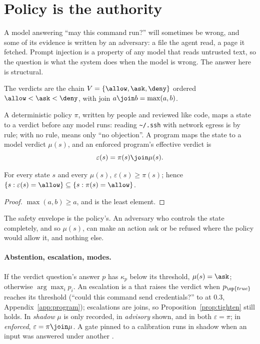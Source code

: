 \section{Policy is the authority}
\label{sec:authority}

A model answering ``may this command run?'' will sometimes be wrong, and some
of its evidence is written by an adversary: a file the agent read, a page it
fetched. Prompt injection is a property of any model that reads untrusted text,
so the question is what the system does when the model is wrong. The answer
here is structural.

\begin{definition}[Verdicts]
The verdicts are the chain $V = \{\allow, \ask, \deny\}$ ordered
$\allow < \ask < \deny$, with join $a \join b = \max(a, b)$.
\end{definition}

A deterministic policy $\pi$, written by people and reviewed like code, maps a
state to a verdict before any model runs: reading \texttt{\textasciitilde/.ssh}
with network egress is \deny{} by rule; with no rule, \allow{} means only ``no
objection''. A program maps the state to a model verdict $\mu(s)$, and an
enforced program's effective verdict is
\begin{equation}
  \varepsilon(s) = \pi(s) \join \mu(s).
  \label{eq:join}
\end{equation}

\begin{proposition}
\label{prop:tighten}
For every state $s$ and every $\mu(s)$, $\varepsilon(s) \ge \pi(s)$; hence
$\{s : \varepsilon(s) = \allow\} \subseteq \{s : \pi(s) = \allow\}$.
\end{proposition}
\begin{proof}
$\max(a, b) \ge a$, and \allow{} is the least element.
\end{proof}

\begin{corollary}
\label{cor:envelope}
The safety envelope is the policy's. An adversary who controls the state
completely, and so $\mu(s)$, can make an action ask or be refused where the
policy would allow it, and nothing else.
\end{corollary}

\paragraph{Abstention, escalation, modes.}
If the verdict question's answer $p$ has $\kappa_p$ below its threshold,
$\mu(s) = \ask$; otherwise $\arg\max_i p_i$. An escalation is a 
that raises the verdict when $p_{\op{true}}$ reaches its threshold (``could
this command send credentials?'' to \deny{} at 0.3,
Appendix~\ref{app:program}); escalations are joins, so
Proposition~\ref{prop:tighten} still holds. In \emph{shadow} $\mu$ is only
recorded, in \emph{advisory} shown, and in both $\varepsilon = \pi$; in
\emph{enforced}, $\varepsilon = \pi \join \mu$. A gate pinned to a
calibration runs in shadow when an input was answered under another
\shipped.

